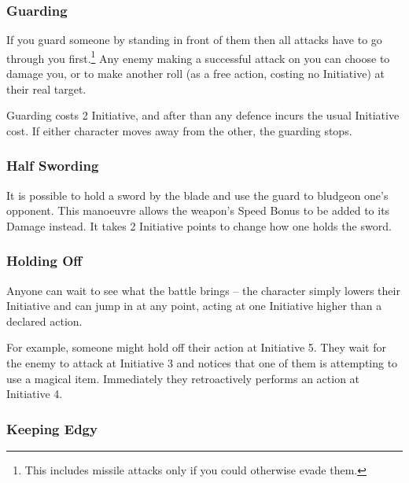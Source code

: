 \begin{multicols}{2}
\subsubsection[Guard: Someone must successfully hit you before they are allowed to hit whomever you are guarding. Cost: 2 Initiative]{Guarding}

If you guard someone by standing in front of them then all attacks have to go through you first.\footnote{This includes missile attacks only if you could otherwise evade them.}
Any enemy making a successful attack on you can choose to damage you, or to make another roll (as a free action, costing no Initiative) at their real target.

Guarding costs 2 Initiative, and after than any defence incurs the usual Initiative cost.
If either character moves away from the other, the guarding stops.

\subsubsection[Half Swording: Add your sword's Speed Bonus to its Damage. Cost: 2 Initiative]{Half Swording}

It is possible to hold a sword by the blade and use the guard to bludgeon one's opponent. This manoeuvre allows the weapon's Speed Bonus to be added to its Damage instead. It takes 2 Initiative points to change how one holds the sword.

\subsubsection[Hold Off: Just don't take your turn. Gain 1 Initiative when you decide to step in]{Holding Off}

Anyone can wait to see what the battle brings -- the character simply lowers their Initiative and can jump in at any point, acting at one Initiative higher than a declared action.

For example, someone might hold off their action at Initiative 5. They wait for the enemy to attack at Initiative 3 and notices that one of them is attempting to use a magical item. Immediately they retroactively performs an action at Initiative 4.

\subsubsection[Keep Edgy: Look out for missiles (allows you to defend against them with Speed Bonus). Cost: 2 Initiative]{Keeping Edgy}
\label{edgy}


\end{multicols}
